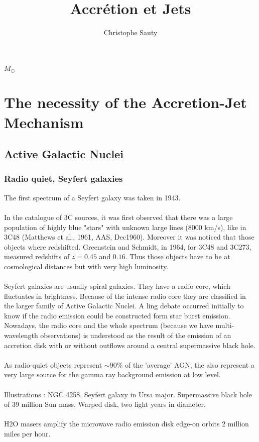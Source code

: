 \documentclass[10pt,a4paper]{article}
\author{Christophe Sauty}
\title{Accrétion et Jets}
\begin{document}
\maketitle

\tableofcontents
\newpage

$M_{\odot}$

\section{The necessity of the Accretion-Jet Mechanism}
\subsection{Active Galactic Nuclei}
\subsubsection{Radio quiet, Seyfert galaxies}
The first spectrum of a Seyfert galaxy was taken in 1943.\\
\\
In the catalogue of 3C sources, it was first observed that there was a large population of highly blue "stars" with unknown large lines (8000 km/s), like in 3C48 (Matthews et al., 1961, AAS, Dec1960). Moreover it was noticed that those objects where redshifted. Greenstein and Schmidt, in 1964, for 3C48 and 3C273, measured redshifts of $z=0.45$ and $0.16$. Thus those objects have to be at cosmological distances but with very high luminosity.\\
\\
Seyfert galaxies are usually spiral galaxies. They have a radio core, which fluctuates in brightness. Because of the intense radio core they are classified in the larger family of Active Galactic Nuclei. A ling debate occurred initially to know if the radio emission could be constructed form star burst emission. Nowadays, the radio core and the whole spectrum (because we have multi-wavelength observations) is understood as the result of the emission of an accretion disk with or without outflows around a central supermassive black hole.\\
\\
As radio-quiet objects represent $\sim 90 \% $ of the 'average' AGN, the also represent a very large source for the gamma ray background emission at low level.\\
\\
Illustrations : NGC 4258, Seyfert galaxy in Ursa major. Supermassive black hole of 39 million Sun mass. Warped disk, two light years in diameter.\\
\\
H2O masers amplify the microwave radio emission disk edge-on orbits 2 million miles per hour.
\end{document}

